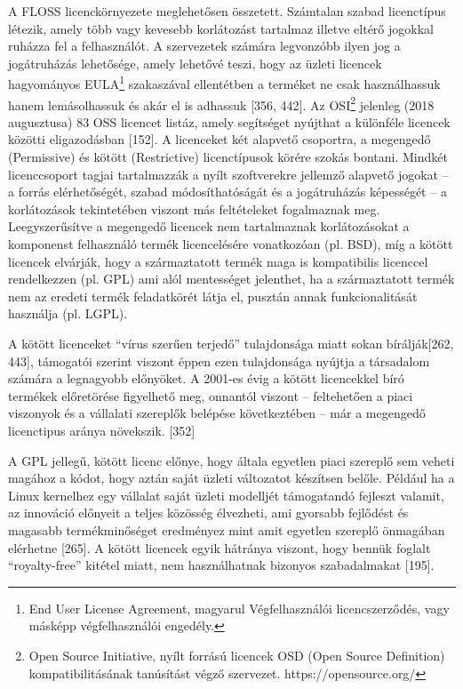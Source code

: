 \documentclass[12pt,magyar,a4paper,oneside]{scrreprt}
\begin{document}
A FLOSS licenckörnyezete meglehetősen összetett. Számtalan szabad
licenctípus létezik, amely több vagy kevesebb korlátozást tartalmaz
illetve eltérő jogokkal ruházza fel a felhasználót. A szervezetek
számára legvonzóbb ilyen jog a jogátruházás lehetősége, amely lehetővé
teszi, hogy az üzleti licencek hagyományos EULA\footnote{End User
  License Agreement, magyarul Végfelhasználói licencszerződés, vagy
  másképp végfelhasználói engedély.} szakaszával ellentétben a terméket
ne csak használhassuk hanem lemásolhassuk és akár el is adhassuk {[}356,
442{]}. Az OSI\footnote{Open Source Initiative, nyílt forrású licencek
  OSD (Open Source Definition) kompatibilitásának tanúsítást végző
  szervezet. https://opensource.org/} jelenleg (2018 augusztusa) 83 OSS
licencet listáz, amely segítséget nyújthat a különféle licencek közötti
eligazodásban {[}152{]}. A licenceket két alapvető csoportra, a
megengedő (Permissive) és kötött (Restrictive) licenctípusok körére
szokás bontani. Mindkét licenccsoport tagjai tartalmazzák a nyílt
szoftverekre jellemző alapvető jogokat -- a forrás elérhetőségét, szabad
módosíthatóságát és a jogátruházás képességét -- a korlátozások
tekintetében viszont más feltételeket fogalmaznak meg. Leegyszerűsítve a
megengedő licencek nem tartalmaznak korlátozásokat a komponenst
felhasználó termék licencelésére vonatkozóan (pl. BSD), míg a kötött
licencek elvárják, hogy a származtatott termék maga is kompatibilis
licenccel rendelkezzen (pl. GPL) ami alól mentességet jelenthet, ha a
származtatott termék nem az eredeti termék feladatkörét látja el,
pusztán annak funkcionalitását használja (pl. LGPL).

A kötött licenceket ``vírus szerűen terjedő'' tulajdonsága miatt sokan
bírálják{[}262, 443{]}, támogatói szerint viszont éppen ezen
tulajdonsága nyújtja a társadalom számára a legnagyobb előnyöket. A
2001-es évig a kötött licencekkel bíró termékek előretörése figyelhető
meg, onnantól viszont -- feltehetően a piaci viszonyok és a vállalati
szereplők belépése következtében -- már a megengedő licenctipus aránya
növekszik. {[}352{]}

A GPL jellegű, kötött licenc előnye, hogy általa egyetlen piaci szereplő
sem veheti magához a kódot, hogy aztán saját üzleti változatot készítsen
belőle. Például ha a Linux kernelhez egy vállalat saját üzleti modelljét
támogatandó fejleszt valamit, az innováció előnyeit a teljes közösség
élvezheti, ami gyorsabb fejlődést és magasabb termékminőséget eredményez
mint amit egyetlen szereplő önmagában elérhetne {[}265{]}. A kötött
licencek egyik hátránya viszont, hogy bennük foglalt ``royalty-free''
kitétel miatt, nem használhatnak bizonyos szabadalmakat {[}195{]}.
\end{document}
